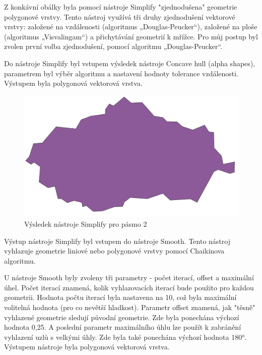 Z konkávní obálky byla pomocí nástroje Simplify "zjednodušena" geometrie polygonové vrstvy. Tento nástroj
využívá tři druhy zjednodušení vektorové vrstvy: založené na vzdálenosti (algoritmus „Douglas-Peucker“),
založené na ploše (algoritmus „Visvalingam“) a přichytávání geometrií k mřížce.
Pro můj postup byl zvolen první volba zjednodušení, pomocí algoritmu „Douglas-Peucker“.

Do nástroje Simplify byl vstupem výsledek nástroje Concave hull (alpha shapes), parametrem byl výběr algoritmu 
a nastavení hodnoty tolerance vzdálenosti. Výstupem byla polygonová vektorová vrstva.

\begin{figure}[H] \centering
    \includegraphics[width=400pt]{./pictures/simplify.png}
    \caption[Výsledek nástroje Simplify pro pásmo 2]{Výsledek nástroje Simplify pro pásmo 2}
	\label{fig:simplify}                                
\end{figure}

Výstup nástroje Simplify byl vstupem do nástroje Smooth. Tento nástroj vyhlazuje geometrie
liniové nebo polygonové vrstvy pomocí Chaikinova algoritmu.

U nástroje Smooth byly zvoleny tři parametry - počet iterací, offset a maximální úhel.
Počet iterací znamená, kolik vyhlazovacích iterací bude použito pro každou geometrii.
Hodnota počtu iterací byla nastavena na 10, což byla maximální volitelná hodnota (pro co nevětší hladkost).
Parametr offset znamená, jak "těsně" vyhlazené geometrie sledují původní geometrie.
Zde byla ponechána výchozí hodnota 0,25. A poslední parametr maximálního úhlu lze použít
k zabránění vyhlazení uzlů s velkými úhly. Zde byla také ponechána výchozí hodnota 180°.
Výstupem nástroje byla polygonová vektorová vrstva.

